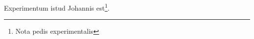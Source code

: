 \documentclass{scrbook}
\begin{document}
Experimentum istud Johannis est\footnote{Nota pedis experimentalis}.

\printindex[res]
\printindex[pers]
\end{document}
